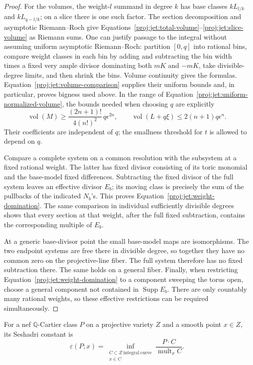 \documentclass[11pt,letterpaper]{article}
\theoremstyle{definition}
\theoremstyle{remark}
\begin{document}
\begin{proof}
For the volumes, the weight-\(l\) summand in degree \(k\) has base
classes \(kL_{l/k}\) and \(kL_{q-l/k}\); on a slice there is one
such factor.  The section decomposition and asymptotic Riemann--Roch
give Equations~\eqref{proj:jet:total-volume}--\eqref{proj:jet:slice-volume}
as Riemann sums.  One can justify passage to the integral without
assuming uniform asymptotic Riemann--Roch: partition \([0,q]\) into
rational bins, compare weight classes in each bin by adding and
subtracting the bin width times a fixed very ample divisor
dominating both \(mK\) and \(-mK\), take divisible-degree limits,
and then shrink the bins.  Volume continuity gives the formulas.
Equation~\eqref{proj:jet:volume-comparison} supplies their uniform bounds
and, in particular, proves bigness used above.
In the range of Equation~\eqref{proj:jet:uniform-normalized-volume},
the bounds needed when choosing \(q\) are explicitly
\[
 \operatorname{vol}(M)\ge \frac{(2n+1)!}{4(n!)^2}\,q\epsilon^{2n},
 \qquad
 \operatorname{vol}(L+q\xi)\le2(n+1)q\epsilon^n.
\]
Their coefficients are independent of \(q\); the smallness threshold
for \(t\) is allowed to depend on \(q\).

Compare a complete system on a common resolution with the subsystem
at a fixed rational weight.  The latter has fixed divisor consisting
of its toric monomial and the base-model fixed differences.
Subtracting the fixed divisor of the full system leaves an effective
divisor \(E_b\); its moving class is precisely the sum of the
pullbacks of the indicated \(N_b\)'s.  This proves
Equation~\eqref{proj:jet:weight-domination}.  The same comparison in
individual sufficiently divisible degrees shows that every section
at that weight, after the full fixed subtraction, contains the
corresponding multiple of \(E_b\).

At a generic base-divisor point the small base-model maps are
isomorphisms.  The two endpoint systems are free there in divisible
degree, so together they have no common zero on the projective-line
fiber.  The full system therefore has no fixed subtraction there.
The same holds on a general fiber.  Finally, when restricting
Equation~\eqref{proj:jet:weight-domination} to a component sweeping the
torus open, choose a general component not contained in
\(\operatorname{Supp} E_b\).  There are only countably many rational weights, so
these effective restrictions can be required simultaneously.
\end{proof}

For a nef \(\mathbb{Q}\)-Cartier class \(P\) on a projective variety \(Z\)
and a smooth point \(x\in Z\), its Seshadri constant is
\[
 \varepsilon(P;x)=
 \inf_{\substack{C\subset Z\ \mathrm{integral\ curve}\\x\in C}}
       \frac{P\cdot C}{\operatorname{mult}_x C}.
\]
\end{document}
